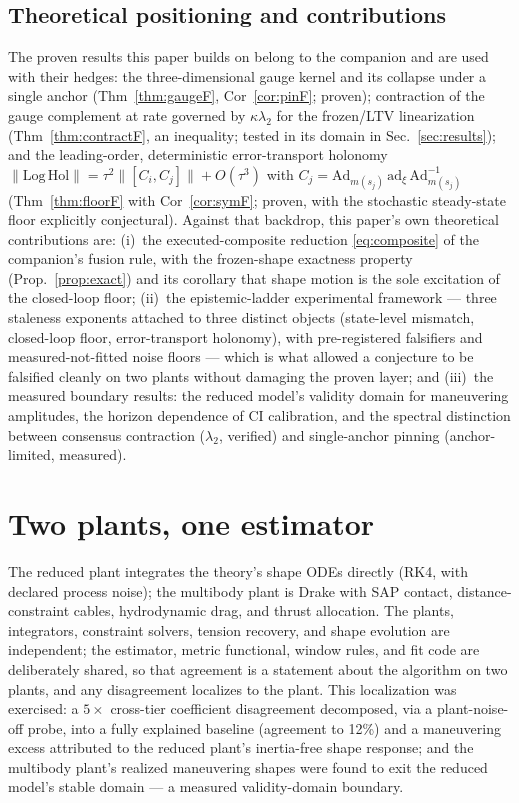 \documentclass[letterpaper, 10pt, journal]{IEEEtran}
\begin{document}
\subsection{Theoretical positioning and contributions}
The proven results this paper builds on belong to the companion and are used
with their hedges: the three-dimensional gauge kernel and its collapse under a
single anchor (Thm~\ref{thm:gaugeF}, Cor~\ref{cor:pinF}; proven); contraction of the gauge complement
at rate governed by $\kappa\lambda_2$ for the frozen/LTV linearization
(Thm~\ref{thm:contractF}, an inequality; tested in its domain in Sec.~\ref{sec:results});
and the leading-order, deterministic error-transport holonomy
$\|\mathrm{Log\,Hol}\| = \tau^2\|[C_i, C_j]\| + O(\tau^3)$ with
$C_j = \mathrm{Ad}_{m(s_j)}\,\mathrm{ad}_\xi\,\mathrm{Ad}_{m(s_j)}^{-1}$
(Thm~\ref{thm:floorF} with Cor~\ref{cor:symF}; proven, with the stochastic steady-state floor
explicitly conjectural). Against that backdrop, this paper's own theoretical
contributions are: (i)~the executed-composite reduction
\eqref{eq:composite} of the companion's fusion rule, with the frozen-shape
exactness property (Prop.~\ref{prop:exact}) and its corollary that shape motion is the sole excitation
of the closed-loop floor; (ii)~the epistemic-ladder experimental framework ---
three staleness exponents attached to three distinct objects (state-level
mismatch, closed-loop floor, error-transport holonomy), with pre-registered
falsifiers and measured-not-fitted noise floors --- which is what allowed a
conjecture to be falsified cleanly on two plants without damaging the proven
layer; and (iii)~the measured boundary results: the reduced model's validity
domain for maneuvering amplitudes, the horizon dependence of CI calibration,
and the spectral distinction between consensus contraction ($\lambda_2$,
verified) and single-anchor pinning (anchor-limited, measured).

\section{Two plants, one estimator}
The reduced plant integrates the theory's shape ODEs directly (RK4, with
declared process noise); the multibody plant is Drake with SAP contact,
distance-constraint cables, hydrodynamic drag, and thrust allocation. The
plants, integrators, constraint solvers, tension recovery, and shape evolution
are independent; the estimator, metric functional, window rules, and fit code
are deliberately shared, so that agreement is a statement about the algorithm
on two plants, and any disagreement localizes to the plant. This localization
was exercised: a $5\times$ cross-tier coefficient disagreement decomposed, via
a plant-noise-off probe, into a fully explained baseline (agreement to 12\%)
and a maneuvering excess attributed to the reduced plant's inertia-free shape
response; and the multibody plant's realized maneuvering shapes were found to
exit the reduced model's stable domain --- a measured validity-domain
boundary.
\end{document}
